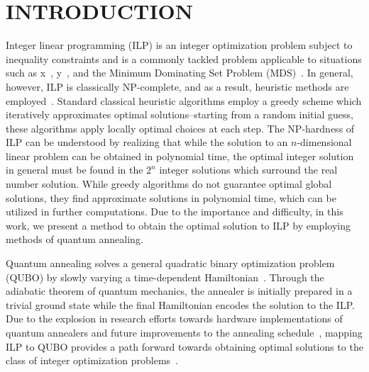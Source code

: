 \documentclass[prd,twocolumn,tightenlines,preprintnumbers,showpacs,superscriptaddress,notitlepage,nofootinbib,eqsecnum,floatfix,longbibliography]{revtex4}
\begin{document}

\maketitle
\tableofcontents

\flushbottom
\maketitle

\section{INTRODUCTION}
\label{sec:introduction}

Integer linear programming (ILP) is an integer optimization problem subject to inequality constraints and is a commonly tackled problem applicable to situations such as x~\cite{}, y~\cite{}, and the Minimum Dominating Set Problem (MDS)~\cite{}.
In general, however, ILP is classically NP-complete, and as a result, heuristic methods are employed~\cite{}.
Standard classical heuristic algorithms employ a greedy scheme which iteratively approximates optimal solutions--starting from a random initial guess, these algorithms apply locally optimal choices at each step.
The NP-hardness of ILP can be understood by realizing that while the solution to an $n$-dimensional linear problem can be obtained in polynomial time, the optimal integer solution in general must be found in the $2^n$ integer solutions which surround the real number solution.
While greedy algorithms do not guarantee optimal global solutions, they find approximate solutions in polynomial time, which can be utilized in further computations.
Due to the importance and difficulty, in this work, we present a method to obtain the optimal solution to ILP by employing methods of quantum annealing.

Quantum annealing solves a general quadratic binary optimization problem (QUBO) by slowly varying a time-dependent Hamiltonian~\cite{}.
Through the adiabatic theorem of quantum mechanics, the annealer is initially prepared in a trivial ground state while the final Hamiltonian encodes the solution to the ILP.
Due to the explosion in research efforts towards hardware implementations of quantum annealers and future improvements to the annealing schedule~\cite{}, mapping ILP to QUBO provides a path forward towards obtaining optimal solutions to the class of integer optimization problems~\cite{2018Glover}.
\end{document}
